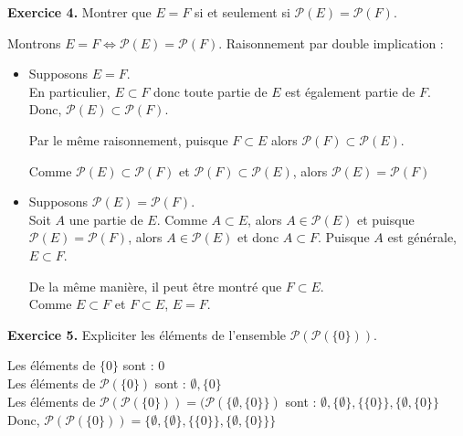\documentclass[a4paper, 10pt]{report}
\begin{document}
	\newpage
	
	\noindent
	\textbf{Exercice 4.} Montrer que $E = F$ si et seulement si
	$\mathcal{P}(E) = \mathcal{P}(F)$.
	
	\colorbox{solution}
	{
		\begin{minipage}{0.9\textwidth}
			Montrons $E = F \iff \mathcal{P}(E) = \mathcal{P}(F)$.
			Raisonnement par double implication :
			\begin{itemize}
				\item[\fbox{\parbox[t][0pt]{6mm}{$\implies$}}]
				Supposons $E = F$.\\
				En particulier, $E \subset F$ donc toute partie de $E$
				est également partie de $F$.\\
				Donc, $\mathcal{P}(E) \subset \mathcal{P}(F)$.
				
				Par le même raisonnement, puisque $F \subset E$ alors
				$\mathcal{P}(F) \subset \mathcal{P}(E)$.
				
				Comme $\mathcal{P}(E) \subset \mathcal{P}(F)$ et
				$\mathcal{P}(F) \subset \mathcal{P}(E)$, alors
				$\mathcal{P}(E) = \mathcal{P}(F)$
				
				\vspace{5mm}
				
				\item[\fbox{\parbox[t][0pt]{6mm}{$\impliedby$}}]
				Supposons $\mathcal{P}(E) = \mathcal{P}(F)$.\\
				Soit $A$ une partie de $E$. Comme $A \subset E$,
				alors $A \in \mathcal{P}(E)$ et puisque
				$\mathcal{P}(E) = \mathcal{P}(F)$, alors
				$A \in \mathcal{P}(E)$ et donc $A \subset F$.			
				Puisque $A$ est générale, $E \subset F$.
				
				De la même manière, il peut être montré que
				$F \subset E$.\\
				Comme $E \subset F$ et $F \subset E$, $E = F$.
			\end{itemize}
			
		\end{minipage}
	}
	
	\vspace{5mm}
	\noindent
	\textbf{Exercice 5.} Expliciter les éléments de l'ensemble
	$\mathcal{P}(\mathcal{P}(\{0\}))$.
		
	\colorbox{solution}
	{
		\begin{minipage}{0.9\textwidth}
			Les éléments de $\{0\}$ sont : $0$\\
			Les éléments de $\mathcal{P}(\{0\})$ sont : $\emptyset, \{0\}$\\
			Les éléments de $\mathcal{P}(\mathcal{P}(\{0\}))
				= (\mathcal{P}(\{\emptyset, \{0\}\})$ sont :
				$\emptyset, \{\emptyset\}, \{\{0\}\}, \{\emptyset, \{0\}\}$\\
			
			Donc, $\mathcal{P}(\mathcal{P}(\{0\})) =
			\{\emptyset, \{\emptyset\}, \{\{0\}\}, \{\emptyset, \{0\}\}\}$
		\end{minipage}
	}
	
\end{document}
